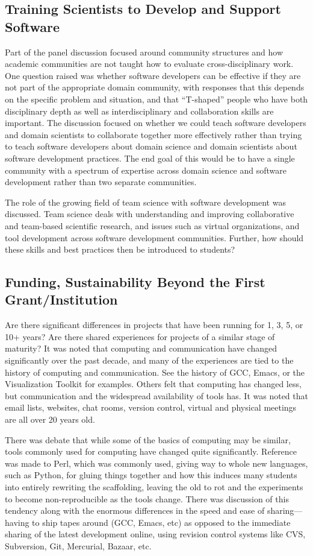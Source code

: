 \documentclass[11pt, oneside]{amsart}
\begin{document}
\subsection{Training Scientists to Develop and Support Software}
Part of the panel discussion focused around community structures and how academic communities are not taught how to evaluate cross-disciplinary work.
One question raised was whether software developers can be effective if they are not part
of the appropriate domain community, with responses that this depends on the
specific problem and situation, and that ``T-shaped'' people who have both disciplinary depth as well as interdisciplinary and collaboration skills are important.
The discussion focused on  whether we could teach software developers and domain scientists to
collaborate together more effectively rather than trying to teach software developers
about domain science and domain scientists about software development practices.
The end goal of this would be to have a single community with a spectrum of expertise across
domain science and software development rather than two separate communities.

The role of the growing field of team science with software development  was discussed. Team science
deals with understanding and improving collaborative and team-based scientific research, and  issues such as virtual organizations,
and tool development across software development communities. Further, how should these skills and best practices then be
introduced to students?

\subsection{Funding, Sustainability Beyond the First Grant/Institution}

Are there significant differences in projects that have been running for 1, 3,
5, or 10+ years? Are there shared experiences for projects of a similar stage
of maturity? It was noted that computing and communication have changed
significantly over the past decade, and many of the experiences are tied to
the history of computing and communication. See the history of GCC, Emacs, or
the Visualization Toolkit for examples. Others felt that computing has changed
less, but communication and the widespread availability of tools has. It was
noted that email lists, websites, chat rooms, version control, virtual and
physical meetings are all over 20 years old.

There was debate that while some of the basics of computing may be
similar, tools commonly used for computing have changed quite
significantly. Reference was made to Perl, which was commonly used, giving way
to whole new languages, such as Python, for gluing things together and how this
induces many students into entirely rewriting the scaffolding, leaving the old
to rot and the experiments to become non-reproducible as the tools change.
 There was
discussion of this tendency along with the enormous differences in the speed and
ease of sharing---having to ship tapes around (GCC, Emacs, etc) as opposed to
the immediate sharing of the latest development online, using revision control
systems like CVS, Subversion, Git, Mercurial, Bazaar, etc.
\end{document}
